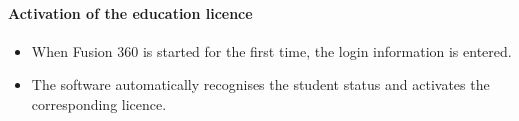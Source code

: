 \paragraph*{Activation of the education licence}
\begin{itemize}
	\item When Fusion 360 is started for the first time, the login information is entered.
	\item The software automatically recognises the student status and activates the corresponding licence.
\end{itemize}
